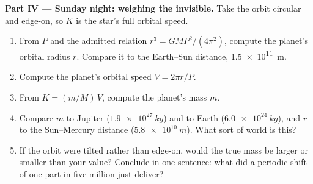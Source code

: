 \begin{problem}
\medskip
\noindent\textbf{Part IV --- Sunday night: weighing the invisible.}
Take the orbit circular and edge-on, so $K$ is the star's full orbital speed.
\begin{enumerate}[resume]
  \item From $P$ and the admitted relation $r^3 = G M P^2/(4\pi^2)$, compute the planet's
        orbital radius $r$. Compare it to the Earth--Sun distance, \qty{1.5e11}{m}.
  \item Compute the planet's orbital speed $V = 2\pi r/P$.
  \item From $K = (m/M)\,V$, compute the planet's mass $m$.
  \item Compare $m$ to Jupiter ($\qty{1.9e27}{kg}$) and to Earth ($\qty{6.0e24}{kg}$), and
        $r$ to the Sun--Mercury distance ($\qty{5.8e10}{m}$). What sort of world is this?
  \item If the orbit were tilted rather than edge-on, would the true mass be larger or
        smaller than your value? Conclude in one sentence: what did a periodic shift of one
        part in five million just deliver?
\end{enumerate}
\end{problem}
